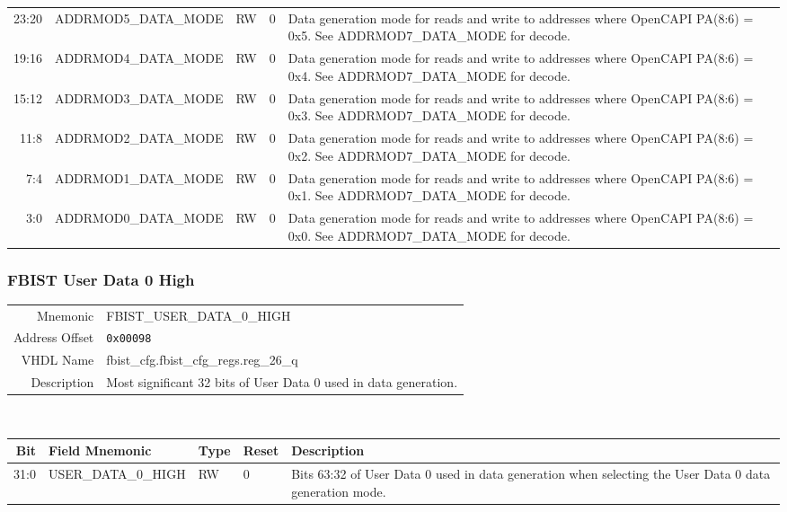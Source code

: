 \begin{tabularx}{\textwidth}{r|l|l|l|X}
  23:20 & ADDRMOD5\_DATA\_MODE & RW   & 0     &

  Data generation mode for reads and write to addresses where OpenCAPI
  PA(8:6) = 0x5. See ADDRMOD7\_DATA\_MODE for decode. \\

  19:16 & ADDRMOD4\_DATA\_MODE & RW   & 0     &

  Data generation mode for reads and write to addresses where OpenCAPI
  PA(8:6) = 0x4. See ADDRMOD7\_DATA\_MODE for decode. \\

  15:12 & ADDRMOD3\_DATA\_MODE & RW   & 0     &

  Data generation mode for reads and write to addresses where OpenCAPI
  PA(8:6) = 0x3. See ADDRMOD7\_DATA\_MODE for decode. \\

  11:8  & ADDRMOD2\_DATA\_MODE & RW   & 0     &

  Data generation mode for reads and write to addresses where OpenCAPI
  PA(8:6) = 0x2. See ADDRMOD7\_DATA\_MODE for decode. \\

  7:4   & ADDRMOD1\_DATA\_MODE & RW   & 0     &

  Data generation mode for reads and write to addresses where OpenCAPI
  PA(8:6) = 0x1. See ADDRMOD7\_DATA\_MODE for decode. \\

  3:0   & ADDRMOD0\_DATA\_MODE & RW   & 0     &

  Data generation mode for reads and write to addresses where OpenCAPI
  PA(8:6) = 0x0. See ADDRMOD7\_DATA\_MODE for decode. \\
\end{tabularx}

\subsubsection{FBIST User Data 0 High}
\begin{tabular}{ r | p{350px} }
  Mnemonic       & FBIST\_USER\_DATA\_0\_HIGH              \\
  Address Offset & \texttt{0x00098}                        \\
  VHDL Name      &  fbist\_cfg.fbist\_cfg\_regs.reg\_26\_q \\ \hline

  Description &
  Most significant 32 bits of User Data 0 used in data generation. \\
\end{tabular}
\\
\begin{tabularx}{\textwidth}{r|l|l|l|X}
  \hline
  Bit   & Field Mnemonic      & Type & Reset & Description \\ \hline

  31:0  & USER\_DATA\_0\_HIGH & RW   & 0     &

  Bits 63:32 of User Data 0 used in data generation when selecting the
  User Data 0 data generation mode. \\
\end{tabularx}

